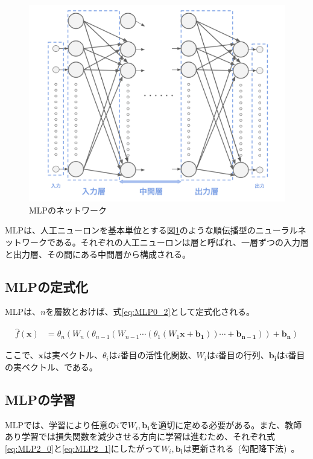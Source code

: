 \begin{figure}[b]
\begin{center}
\includegraphics[width=0.7\hsize]{figure/mlp_net.png}
\caption{MLPのネットワーク}
\label{fig:MLP_net}
\end{center}
\end{figure}

MLPは、人工ニューロンを基本単位とする図\ref{fig:MLP_net}のような順伝播型のニューラルネットワークである。それぞれの人工ニューロンは層と呼ばれ、一層ずつの入力層と出力層、その間にある中間層から構成される。

\subsection{MLPの定式化}

MLPは、$n$を層数とおけば、式\ref{eq:MLP0_2}として定式化される。

\begin{align}
    \label{eq:MLP0_2}
    \hat{f}(\boldsymbol{x})&=\theta_{n}(W_{n}(\theta_{n-1}(W_{n-1}\cdots(\theta_{1}(W_{1}\boldsymbol{x}+\boldsymbol{b_{1}}))\cdots+\boldsymbol{b_{n-1}}))+\boldsymbol{b_{n}})
\end{align}

ここで、$\boldsymbol{x}$は実ベクトル、$\theta_{i}$は$i$番目の活性化関数、$W_{i}$は$i$番目の行列、$\boldsymbol{b_{i}}$は$i$番目の実ベクトル、である。

\subsection{MLPの学習}

MLPでは、学習により任意の$i$で$W_i,\boldsymbol{b_i}$を適切に定める必要がある。また、教師あり学習では損失関数を減少させる方向に学習は進むため、それぞれ式\ref{eq:MLP2_0}と\ref{eq:MLP2_1}にしたがって$W_i,\boldsymbol{b_i}$は更新される~(勾配降下法)~。

